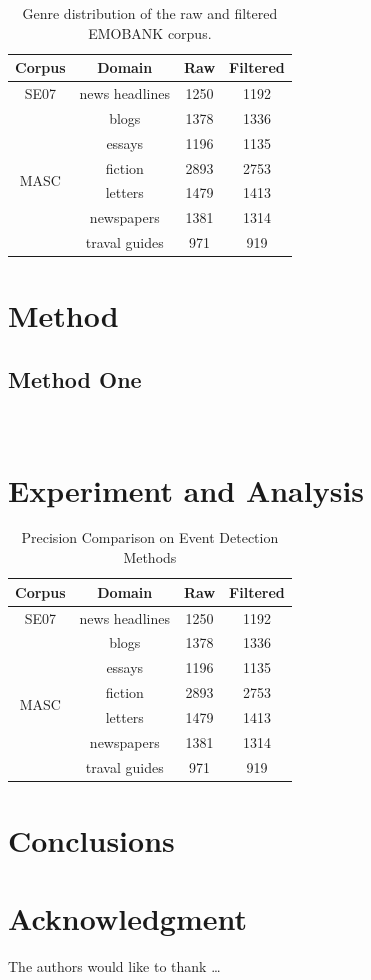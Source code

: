 \begin{table}[htbp]  \centering
	\caption{Genre distribution of the raw and filtered
		EMOBANK corpus.}
	\label{tbl:emobank}
	\begin{tabular}{cccc}
		\toprule
		Corpus & Domain  & Raw & Filtered  \\
		\midrule
		SE07 &  news headlines &  1250 &  1192 \\
		\hline
		\multirow{6}{*}{MASC} &  blogs&  1378&  1336\\
		&  essays &  1196 &  1135 \\
		&  fiction &  2893 &  2753 \\
		&  letters &  1479 &  1413 \\
		& newspapers & 1381 & 1314 \\
		& traval guides & 971 & 919 \\
		\bottomrule
	\end{tabular}
\end{table}


\section{Method} \label{sec-method}

\subsection{Method One}
\


\section{Experiment and Analysis} \label{sec-experiment}


\begin{table} [htbp] \centering
  \caption{Precision Comparison on Event Detection Methods}
  \label{tbl:overall-experiments}
  \begin{tabular}{cccc}
\toprule
Corpus & Domain  & Raw & Filtered  \\
\midrule
SE07 &  news headlines &  1250 &  1192 \\
\hline
\multirow{6}{*}{MASC} &  blogs&  1378&  1336\\
&  essays &  1196 &  1135 \\
&  fiction &  2893 &  2753 \\
&  letters &  1479 &  1413 \\
& newspapers & 1381 & 1314 \\
& traval guides & 971 & 919 \\
\bottomrule
\end{tabular}
\end{table}


\section{Conclusions} \label{sec-conclusions}

\blindtext

\section*{Acknowledgment}

\lipsum[1]


The authors would like to thank \ldots

